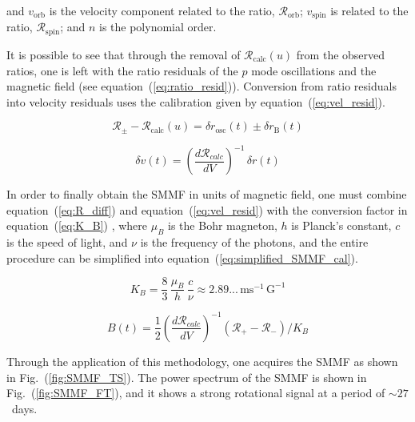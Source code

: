 and $v_{\mathrm{orb}}$ is the velocity component related to the ratio,  $\mathcal{R}_{\mathrm{orb}}$; $v_{\mathrm{spin}}$ is related to the ratio, $\mathcal{R}_{\mathrm{spin}}$; and $n$ is the polynomial order.

It is possible to see that through the removal of $\mathcal{R}_{\mathrm{calc}}(u)$ from the observed ratios, one is left with the ratio residuals of the $p$ mode oscillations and the magnetic field (see equation~(\ref{eq:ratio_resid})). Conversion from ratio residuals into velocity residuals uses the calibration given by equation~(\ref{eq:vel_resid}).

\begin{equation}
\mathcal{R}_{\pm} - \mathcal{R}_{\mathrm{calc}}(u) = \delta {r}_{\mathrm{osc}}(t) \pm \delta {r}_{\mathrm{B}}(t)
\label{eq:ratio_resid}
\end{equation}

\begin{equation}
\delta v(t) = \left( \frac{d\mathcal{R}_{calc}}{dV} \right)^{-1} \, \delta {r}(t)
\label{eq:vel_resid}
\end{equation}

In order to finally obtain the SMMF in units of magnetic field, one must combine equation~(\ref{eq:R_diff}) and  equation~(\ref{eq:vel_resid}) with the conversion factor in equation~(\ref{eq:K_B}) \citep{dumbill_observation_1999}, where $\mu_B$ is the Bohr magneton, $h$ is Planck's constant, $c$ is the speed of light, and $\nu$ is the frequency of the photons, and the entire procedure can be simplified into equation~(\ref{eq:simplified_SMMF_cal}).

\begin{equation}
K_B = \frac{8}{3} \, \frac{\mu_B}{h} \, \frac{c}{\nu} \approx 2.89... \, \mathrm{ms}^{-1} \, \mathrm{G}^{-1}
\label{eq:K_B}
\end{equation}

\begin{equation}
B(t) = \frac{1}{2} \left( \frac{d\mathcal{R}_{calc}}{dV} \right)^{-1} (\mathcal{R}_{+} - \mathcal{R}_{-}) / K_B
\label{eq:simplified_SMMF_cal}
\end{equation}

Through the application of this methodology, one acquires the SMMF as shown in Fig.~(\ref{fig:SMMF_TS}). The power spectrum of the SMMF is shown in Fig.~(\ref{fig:SMMF_FT}), and it shows a strong rotational signal at a period of $\sim27$~days. 


